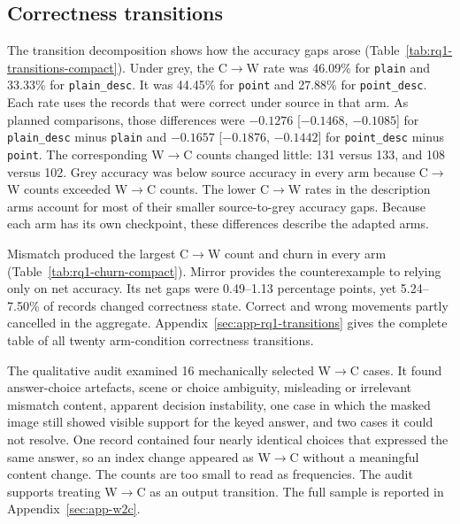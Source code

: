 \subsection{Correctness transitions}
\label{sec:results-rq1-transitions}

The transition decomposition shows how the accuracy gaps arose
(Table~\ref{tab:rq1-transitions-compact}). Under grey, the
C$\rightarrow$W rate was 46.09\% for \texttt{plain} and 33.33\% for
\texttt{plain\_desc}. It was 44.45\% for \texttt{point} and 27.88\% for
\texttt{point\_desc}. Each rate uses the records that were correct under source
in that arm. As planned comparisons, those differences were $-0.1276$
[$-0.1468$, $-0.1085$] for \texttt{plain\_desc} minus \texttt{plain} and
$-0.1657$ [$-0.1876$, $-0.1442$] for \texttt{point\_desc} minus
\texttt{point}. The corresponding W$\rightarrow$C counts changed little:
131 versus 133, and 108 versus 102. Grey accuracy was below source accuracy in
every arm because C$\rightarrow$W counts exceeded W$\rightarrow$C counts.
The lower C$\rightarrow$W rates in the description arms account for most of
their smaller source-to-grey accuracy gaps. Because each arm has its own
checkpoint, these differences describe the adapted arms.

Mismatch produced the largest C$\rightarrow$W count and churn in every arm
(\mbox{Table}~\ref{tab:rq1-churn-compact}). Mirror provides the counterexample to
relying only on net accuracy. Its net gaps were 0.49--1.13 percentage points,
yet 5.24--7.50\% of records changed correctness state. Correct and wrong
movements partly cancelled in the aggregate. Appendix~\ref{sec:app-rq1-transitions}
gives the complete table of all twenty arm-condition correctness transitions.

\begingroup
\let\table\inplacetable
\let\endtable\endinplacetable

\endgroup

The qualitative audit examined 16 mechanically selected W$\rightarrow$C cases.
It found answer-choice artefacts, scene or choice
ambiguity, misleading or irrelevant mismatch content, apparent decision
instability, one case in which the masked image still showed visible support for
the keyed answer, and two cases it could not resolve. One record contained four
nearly identical choices that expressed the same answer, so an index change
appeared as W$\rightarrow$C without a meaningful content change. The counts are
too small to read as frequencies. The audit supports treating W$\rightarrow$C as
an output transition. The full
sample is reported in Appendix~\ref{sec:app-w2c}.

